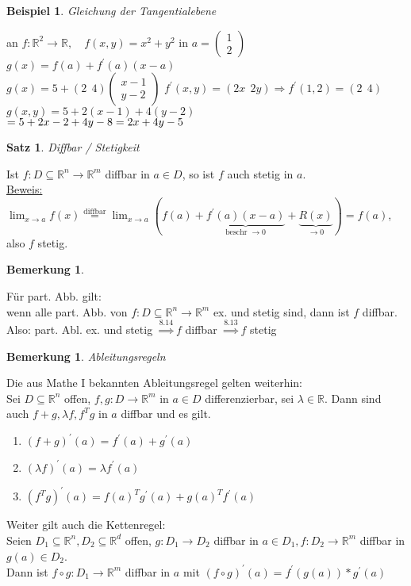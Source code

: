 \documentclass[a4paper,11pt]{article}
\newtheorem{satz}[definition]{Satz}
\newtheorem{bsp}[definition]{Beispiel}
\newtheorem{bem}[definition]{Bemerkung}
\begin{document}
\begin{bsp}
	Gleichung der Tangentialebene
\end{bsp}
an $f\colon\mathbb{R}^2\to\mathbb{R},\quad f(x,y)=x^2+y^2$ in $a=\begin{pmatrix}1\\2\end{pmatrix}$ \\
$g(x)=f(a)+f^\prime(a)(x-a)$ \\
$g(x)=5+(2\:\:4)\begin{pmatrix}x-1\\y-2\end{pmatrix}$ \hspace{40mm} $f^\prime(x,y)=(2x\:\:2y)\Rightarrow f^\prime(1,2)=(2\:\:4)$ \\
$g(x,y)=5+2(x-1)+4(y-2)$ \\
$=5+2x-2+4y-8 \\
=2x+4y-5$

\begin{satz}
	Diffbar / Stetigkeit
\end{satz}
Ist $f\colon D\subseteq\mathbb{R}^n\to\mathbb{R}^m$ diffbar in $a\in D$, so ist $f$ auch stetig in $a$. \\
\underline{Beweis:} \\
$\lim_{x\to a}f(x)\overset{\text{diffbar}}{=}\lim_{x\to a}(f(a)+\underbrace{f^\prime(a)(x-a)}_{\text{beschr }\to0}+\underbrace{R(x)}_{\to0})=f(a)$, also $f$ stetig.

\begin{bem}
\end{bem}
Für part. Abb. gilt: \\
wenn alle part. Abb. von $f\colon D\subseteq\mathbb{R}^n\to\mathbb{R}^m$ ex. und stetig sind, dann ist $f$ diffbar. \\
Also: part. Abl. ex. und stetig $\overset{8.14}{\Rightarrow}f$ diffbar $\overset{8.13}{\Rightarrow}f$ stetig

\newpage

\begin{bem}
	Ableitungsregeln
\end{bem}
Die aus Mathe I bekannten Ableitungsregel gelten weiterhin: \\
Sei $D\subseteq\mathbb{R}^n$ offen, $f,g\colon D\to\mathbb{R}^m$ in $a\in D$ differenzierbar, sei $\lambda\in\mathbb{R}$. Dann sind auch $f+g,\lambda f,f^Tg$ in $a$ diffbar und es gilt.
\begin{enumerate}[label=\alph*)]
	\item $(f+g)^\prime(a)=f^\prime(a)+g^\prime(a)$
	\item $(\lambda f)^\prime(a)=\lambda f^\prime(a)$ 
	\item $(f^Tg)^\prime(a)=f(a)^Tg^\prime(a)+g(a)^Tf^\prime(a)$
\end{enumerate}
Weiter gilt auch die Kettenregel: \\
Seien $D_1\subseteq\mathbb{R}^n,D_2\subseteq\mathbb{R}^d$ offen, $g\colon D_1\to D_2$ diffbar in $a\in D_1, f\colon D_2\to\mathbb{R}^m$ diffbar in $g(a)\in D_2$. \\
Dann ist $f\circ g\colon D_1\to\mathbb{R}^m$ diffbar in $a$ mit $(f\circ g)^\prime(a)=f^\prime(g(a))*g^\prime(a)$
\end{document}
